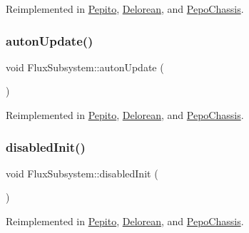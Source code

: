 Reimplemented in \hyperlink{classPepito_ac9a8b75ef48cd95683733af317618ca4}{Pepito}, \hyperlink{classDelorean_ad06990e5c59d5f4d30b48015e744cc49}{Delorean}, and \hyperlink{classPepoChassis_a10380f1dad79ff1daa295d0673a1051f}{Pepo\+Chassis}.

\mbox{\label{classFluxSubsystem_aceed900af22503022b8d1278f3693f77}} 
\subsubsection{\texorpdfstring{auton\+Update()}{autonUpdate()}}
{\footnotesize\ttfamily void Flux\+Subsystem\+::auton\+Update (\begin{DoxyParamCaption}{ }\end{DoxyParamCaption})\hspace{0.3cm}{\ttfamily [virtual]}}



Reimplemented in \hyperlink{classPepito_a42cc57495399c63940571b113e7140f8}{Pepito}, \hyperlink{classDelorean_a17c9b875c9c0d3c9b9dadd5838bfedfd}{Delorean}, and \hyperlink{classPepoChassis_ab1e73685898517c8fa2f81c5c7a6a56c}{Pepo\+Chassis}.

\mbox{\label{classFluxSubsystem_aa0b8fde8aa5094627d15d24e545e1da4}} 
\subsubsection{\texorpdfstring{disabled\+Init()}{disabledInit()}}
{\footnotesize\ttfamily void Flux\+Subsystem\+::disabled\+Init (\begin{DoxyParamCaption}{ }\end{DoxyParamCaption})\hspace{0.3cm}{\ttfamily [virtual]}}



Reimplemented in \hyperlink{classPepito_a04a85eae33c653f9555b6db43d50b210}{Pepito}, \hyperlink{classDelorean_ae054ba79b38b46d20e50becb5d31884c}{Delorean}, and \hyperlink{classPepoChassis_af5f6848de51ac4c47cbf2f9f706b1485}{Pepo\+Chassis}.

\mbox{\label{classFluxSubsystem_a5c39cb0f0834cc77a2b8f4f47778da87}} 
